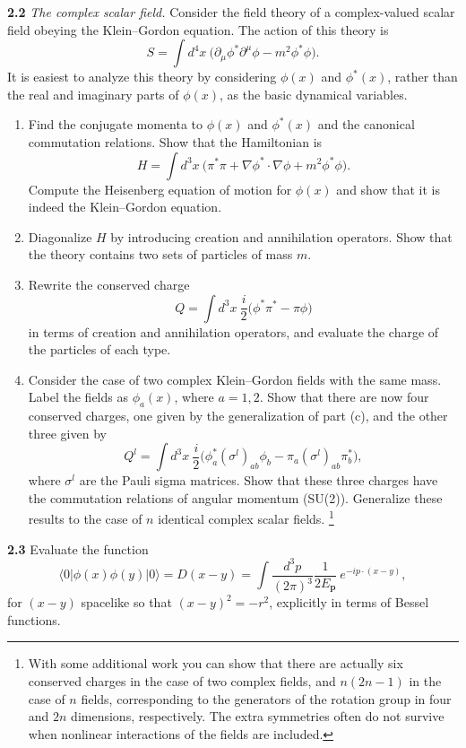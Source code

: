 \textbf{2.2} \emph{The complex scalar field.}  Consider the field theory of
a complex-valued scalar field obeying the Klein--Gordon equation.  The
action of this theory is
\begin{equation}
  S = \int d^4x\ \bigl( \partial_\mu\phi^{*}\partial^\mu\phi - m^2\phi^{*}\phi
    \bigr).
\end{equation}
It is easiest to analyze this theory by considering $\phi(x)$ and
$\phi^{*}(x)$, rather than the real and imaginary parts of $\phi(x)$, as
the basic dynamical variables.
\begin{enumerate}[label=(\alph*)]
  \item Find the conjugate momenta to $\phi(x)$ and $\phi^{*}(x)$ and the
    canonical commutation relations.  Show that the Hamiltonian is
    \begin{equation}
      H = \int d^3x\ \bigl( \pi^{*}\pi + \nabla\phi^{*}\cdot\nabla\phi
        + m^2\phi^{*}\phi \bigr).
    \end{equation}
    Compute the Heisenberg equation of motion for $\phi(x)$ and show that
    it is indeed the Klein--Gordon equation.
  \item Diagonalize $H$ by introducing creation and annihilation
    operators.  Show that the theory contains two sets of particles of
    mass $m$.
  \item Rewrite the conserved charge
    \begin{equation}
      Q = \int d^3x\ \frac{i}{2}\bigl( \phi^{*}\pi^{*} - \pi\phi \bigr)
    \end{equation}
    in terms of creation and annihilation operators, and evaluate the
    charge of the particles of each type.
  \item Consider the case of two complex Klein--Gordon fields with the
    same mass.  Label the fields as $\phi_a(x)$, where $a=1,2$.  Show that
    there are now four conserved charges, one given by the generalization
    of part (c), and the other three given by
    \begin{equation}
      Q^l = \int d^3x\ \frac{i}{2}\bigl(
        \phi^{*}_a(\sigma^l)_{ab}\phi_b - \pi_a(\sigma^l)_{ab}\pi^{*}_b \bigr),
    \end{equation}
    where $\sigma^l$ are the Pauli sigma matrices.  Show that these three
    charges have the commutation relations of angular momentum (SU(2)).
    Generalize these results to the case of $n$ identical complex scalar
    fields.%
    \footnote{With some additional work you can show that there are
    actually six conserved charges in the case of two complex fields, and
    $n(2n-1)$ in the case of $n$ fields, corresponding to the generators
    of the rotation group in four and $2n$ dimensions, respectively.  The
    extra symmetries often do not survive when nonlinear interactions of
    the fields are included.}
\end{enumerate}

\textbf{2.3} Evaluate the function
\begin{equation}
  \langle 0|\phi(x)\phi(y)|0\rangle = D(x-y) = \int \frac{d^3p}{(2\pi)^3}
    \frac{1}{2E_{\mathbf{p}}}\ e^{-ip\cdot(x-y)},
\end{equation}
for $(x-y)$ spacelike so that $(x-y)^2 = -r^2$, explicitly in terms of
Bessel functions.
